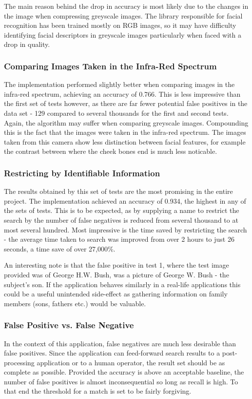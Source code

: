 \documentclass[12pt]{article}
\begin{document}
The main reason behind the drop in accuracy is most likely due to the changes in the image when compressing greyscale images. The library responsible for facial recognition has been trained mostly on RGB images, so it may have difficulty identifying facial descriptors in greyscale images particularly when faced with a drop in quality.

\subsubsection{Comparing Images Taken in the Infra-Red Spectrum}
The implementation performed slightly better when comparing images in the infra-red spectrum, achieving an accuracy of 0.766. This is less impressive than the first set of tests however, as there are far fewer potential false positives in the data set - 129 compared to several thousands for the first and second tests. Again, the algorithm may suffer when comparing greyscale images. Compounding this is the fact that the images were taken in the infra-red spectrum. The images taken from this camera show less distinction between facial features, for example the contrast between where the cheek bones end is much less noticable.

\subsubsection{Restricting by Identifiable Information}
The results obtained by this set of tests are the most promising in the entire project. The implementation achieved an accuracy of 0.934, the highest in any of the sets of tests. This is to be expected, as by supplying a name to restrict the search by the number of false negatives is reduced from several thousand to at most several hundred. Most impressive is the time saved by restricting the search - the average time taken to search was improved from over 2 hours to just 26 seconds, a time save of over 27,000\%.

An interesting note is that the false positive in test 1, where the test image provided was of George H.W. Bush, was a picture of George W. Bush - the subject's son. If the application behaves similarly in a real-life applications this could be a useful unintended side-effect as gathering information on family members (sons, fathers etc.) would be valuable.

\subsubsection{False Positive vs. False Negative}
In the context of this application, false negatives are much less desirable than false positives. Since the application can feed-forward search results to a post-processing application or to a human operator, the result set should be as complete as possible. Provided the accuracy is above an acceptable baseline, the number of false positives is almost inconsequential so long as recall is high. To that end the threshold for a match is set to be fairly forgiving.
\end{document}
